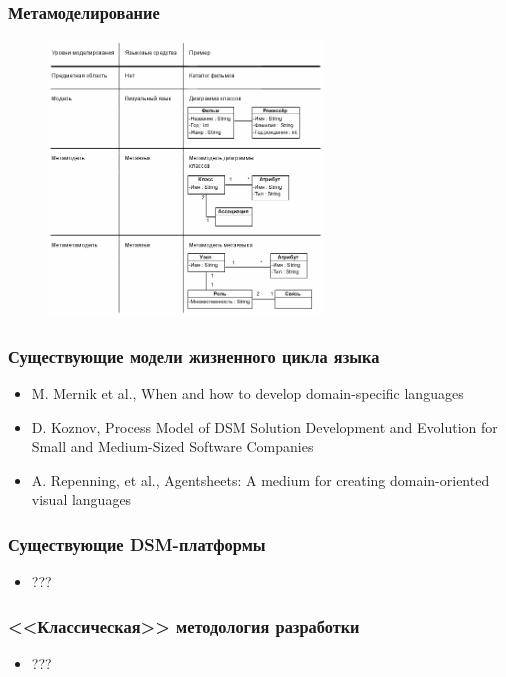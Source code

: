 \documentclass[14pt]{beamer}
\begin{document}
\begin{frame}
    \frametitle{Метамоделирование}
    \vspace*{-0.3cm}
    \begin{figure}
    	\begin{center}
    		\includegraphics[width=0.65\textwidth]{images/part1/metalevels.png}
    	\end{center}
    \end{figure}
\end{frame}

\begin{frame}
    \frametitle{Существующие модели жизненного цикла языка}
    \begin{itemize}
        \item M. Mernik et al., When and how to develop domain-specific languages
        \item D. Koznov, Process Model of DSM Solution Development and Evolution 
            for Small and Medium-Sized Software Companies
        \item A. Repenning, et al., Agentsheets: A medium for creating 
            domain-oriented visual languages
    \end{itemize}
\end{frame}

\begin{frame}
    \frametitle{Существующие DSM-платформы}
    \begin{itemize}
        \item ???
    \end{itemize}
\end{frame}

\begin{frame}
    \frametitle{<<Классическая>> методология разработки}
    \begin{itemize}
        \item ???
    \end{itemize}
\end{frame}
\end{document}

